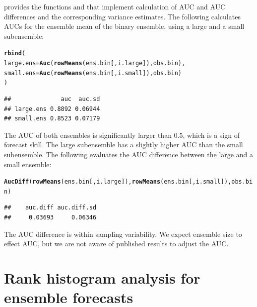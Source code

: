\documentclass[article]{jss}\usepackage{graphicx, color}
\makeatletter
\newcommand{\hlfunctioncall}[1]{\textcolor[rgb]{0,0.501960784313725,0.752941176470588}{\textbf{#1}}}%
\newenvironment{kframe}{%
 \def\at@end@of@kframe{}%
 \ifinner\ifhmode%
  \def\at@end@of@kframe{\end{minipage}}%
  \begin{minipage}{\columnwidth}%
 \fi\fi%
 \def\FrameCommand##1{\hskip\@totalleftmargin \hskip-\fboxsep
 \colorbox{shadecolor}{##1}\hskip-\fboxsep
     \hskip-\linewidth \hskip-\@totalleftmargin \hskip\columnwidth}%
 \MakeFramed {\advance\hsize-\width
   \@totalleftmargin\z@ \linewidth\hsize
   \@setminipage}}%
 {\par\unskip\endMakeFramed%
 \at@end@of@kframe}
\newenvironment{knitrout}{}{} %
\makeatother
\begin{document}
 provides the functions  and  that implement calculation of AUC and AUC differences and the corresponding variance estimates.
The following calculates AUCs for the ensemble mean of the binary ensemble, using a large and a small subensemble:
%
\begin{knitrout}
\color{fgcolor}\begin{kframe}
\begin{alltt}
\hlfunctioncall{rbind}(
  large.ens = \hlfunctioncall{Auc}(\hlfunctioncall{rowMeans}(ens.bin[, i.large]), obs.bin),
  small.ens = \hlfunctioncall{Auc}(\hlfunctioncall{rowMeans}(ens.bin[, i.small]), obs.bin)
)
\end{alltt}
\begin{verbatim}
##              auc  auc.sd
## large.ens 0.8892 0.06944
## small.ens 0.8523 0.07179
\end{verbatim}
\end{kframe}
\end{knitrout}

%
The AUC of both ensembles is significantly larger than 0.5, which is a sign of forecast skill.
The large subensemble has a slightly higher AUC than the small subensemble.
The following evaluates the AUC difference between the large and a small ensemble:
%
\begin{knitrout}
\color{fgcolor}\begin{kframe}
\begin{alltt}
\hlfunctioncall{AucDiff}(\hlfunctioncall{rowMeans}(ens.bin[, i.large]), \hlfunctioncall{rowMeans}(ens.bin[, i.small]), obs.bin)
\end{alltt}
\begin{verbatim}
##    auc.diff auc.diff.sd 
##     0.03693     0.06346
\end{verbatim}
\end{kframe}
\end{knitrout}

%
The AUC difference is within sampling variability.
We expect ensemble size to effect AUC, but we are not aware of published results to adjust the AUC.



\section{Rank histogram analysis for ensemble forecasts}
\end{document}
